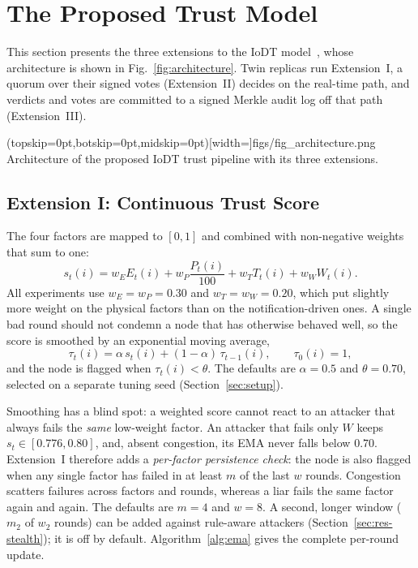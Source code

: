 \documentclass{ieeeaccess}
\begin{document}
\section{The Proposed Trust Model}
\label{sec:proposedModel}
This section presents the three extensions to the IoDT
model~\cite{soula2024iodt}, whose architecture is shown in
Fig.~\ref{fig:architecture}.  Twin replicas run Extension~I, a quorum
over their signed votes (Extension~II) decides on the real-time path,
and verdicts and votes are committed to a signed Merkle audit log off
that path (Extension~III).

\Figure[!t](topskip=0pt,botskip=0pt,midskip=0pt)[width=\textwidth]{figs/fig_architecture.png}
{Architecture of the proposed IoDT trust pipeline with its three extensions.\label{fig:architecture}}

\subsection{Extension I: Continuous Trust Score}
\label{subsec:ext1-math}
The four factors are mapped to $[0,1]$ and combined with non-negative
weights that sum to one:
\begin{equation}
s_{t}(i) = w_{E}E_{t}(i) + w_{P}\frac{P_{t}(i)}{100}
         + w_{T}T_{t}(i) + w_{W}W_{t}(i).
\label{eq:weighted_score}
\end{equation}
All experiments use $w_{E}=w_{P}=0.30$ and $w_{T}=w_{W}=0.20$, which
put slightly more weight on the physical factors than on the
notification-driven ones.  A single bad round should not condemn a
node that has otherwise behaved well, so the score is smoothed by an
exponential moving average,
\begin{equation}
\tau_{t}(i) = \alpha\,s_{t}(i) + (1-\alpha)\,\tau_{t-1}(i),
\qquad \tau_{0}(i)=1,
\label{eq:ema}
\end{equation}
and the node is flagged when $\tau_t(i)<\theta$.  The defaults are
$\alpha=0.5$ and $\theta=0.70$, selected on a separate tuning seed
(Section~\ref{sec:setup}).

Smoothing has a blind spot: a weighted score cannot react to an
attacker that always fails the \emph{same} low-weight factor.  An
attacker that fails only $W$ keeps $s_t\in[0.776,0.80]$, and, absent
congestion, its EMA never falls below $0.70$.  Extension~I therefore adds a
\emph{per-factor persistence check}: the node is also flagged when any
single factor has failed in at least $m$ of the last $w$ rounds.
Congestion scatters failures across factors and rounds, whereas a
liar fails the same factor again and again.  The defaults are $m=4$
and $w=8$.  A second, longer window ($m_2$ of $w_2$ rounds) can be
added against rule-aware attackers (Section~\ref{sec:res-stealth}); it
is off by default.  Algorithm~\ref{alg:ema} gives the complete
per-round update.
\end{document}
